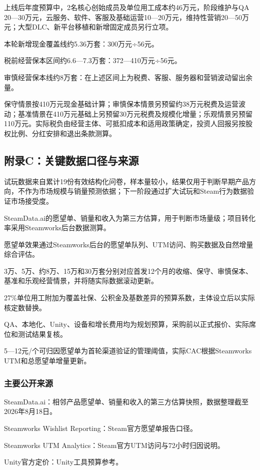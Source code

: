 \documentclass[UTF8,fontset=none,zihao=5,twoside]{ctexart}
\begin{document}
上线后年度预算中，2名核心创始成员及单位用工成本约46万元，阶段维护与QA 20---30万元，云服务、软件、客服及基础运营10---20万元，维持性营销20---50万元；大型DLC、新平台移植和新增固定成员另行立项。

本轮新增现金覆盖线约5.36万套：300万元÷56元。

税前经营保本区间约6.6---7.3万套：372---410万元÷56元。

审慎经营保本线约8万套：在上述区间上为税费、客服、服务器和营销波动留出余量。

保守情景按410万元现金基础计算；审慎保本情景另预留约38万元税费及运营波动；基准情景在410万元基础上另预留30万元税费及规模化增量；乐观情景另预留110万元。实际税负由经营主体、可抵扣成本和适用政策确定，投资人回报另按股权比例、分红安排和退出条款测算。

\subsection{附录C：关键数据口径与来源}\label{ux9644ux5f55cux5173ux952eux6570ux636eux53e3ux5f84ux4e0eux6765ux6e90}

试玩数据来自累计19份有效结构化问卷，样本量较小，结果仅用于判断早期产品方向，不作为市场规模与销量预测依据；下一阶段通过扩大试玩和Steam行为数据验证市场接受度。

SteamData.ai的愿望单、销量和收入为第三方估算，用于判断市场量级；项目转化率采用Steamworks后台数据测算。

愿望单效果通过Steamworks后台的愿望单队列、UTM访问、购买数据及自然增量综合评估。

3万、5万、约8万、15万和30万套分别对应首发12个月的收缩、保守、审慎保本、基准和乐观经营情景，并将随实际数据滚动更新。

27\%单位用工附加为覆盖社保、公积金及基数差异的预算系数，主体设立后以实际核定数替换。

QA、本地化、Unity、设备和增长费用均为规划预算，采购前以正式报价、实际席位和测试结果复核。

5---12元/个可归因愿望单为首轮渠道验证的管理阈值，实际CAC根据Steamworks UTM和总愿望单增量更新。

\subsubsection{主要公开来源}\label{ux4e3bux8981ux516cux5f00ux6765ux6e90}

SteamData.ai：相邻产品愿望单、销量和收入的第三方估算快照，数据整理截至2026年8月18日。

Steamworks Wishlist Reporting：Steam官方愿望单报告口径。

Steamworks UTM Analytics：Steam官方UTM访问与72小时归因说明。

Unity官方定价：Unity工具预算参考。
\end{document}
